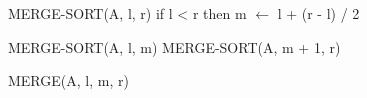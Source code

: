 \begin{pseudocode}[caption={Algoritmo de ordenação por mesclagem}, label={mergeSortP}]
MERGE-SORT(A, l, r)
if l < r then
    m $\gets$ l + (r - l) / 2

    MERGE-SORT(A, l, m)
    MERGE-SORT(A, m + 1, r)

    MERGE(A, l, m, r)
\end{pseudocode}